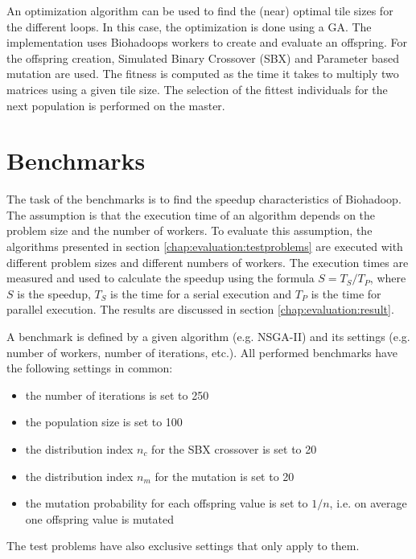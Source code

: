 An optimization algorithm can be used to find the (near) optimal tile sizes for the different loops. In this case, the optimization is done using a GA. The implementation uses Biohadoops workers to create and evaluate an offspring. For the offspring creation, Simulated Binary Crossover (SBX) and Parameter based mutation are used. The fitness is computed as the time it takes to multiply two matrices using a given tile size. The selection of the fittest individuals for the next population is performed on the master.

\section{Benchmarks}
\label{chap:evaluation:benchmarks}
The task of the benchmarks is to find the speedup characteristics of Biohadoop. The assumption is that the execution time of an algorithm depends on the problem size and the number of workers. To evaluate this assumption, the algorithms presented in section \ref{chap:evaluation:testproblems} are executed with different problem sizes and different numbers of workers. The execution times are measured and used to calculate the speedup using the formula $S = T_S / T_P$, where $S$ is the speedup, $T_S$ is the time for a serial execution and $T_P$ is the time for parallel execution. The results are discussed in section \ref{chap:evaluation:result}.


A benchmark is defined by a given algorithm (e.g. NSGA-II) and its settings (e.g. number of workers, number of iterations, etc.). All performed benchmarks have the following settings in common:
\begin{itemize}
  \item the number of iterations is set to 250
  \item the population size is set to 100
  \item the distribution index $n_c$ for the SBX crossover is set to 20
  \item the distribution index $n_m$ for the mutation is set to 20
  \item the mutation probability for each offspring value is set to $1/n$, i.e. on average one offspring value is mutated
\end{itemize}

The test problems have also exclusive settings that only apply to them.

